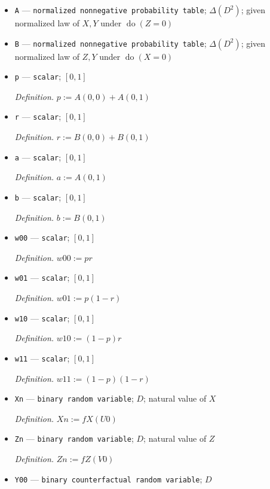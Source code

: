 \documentclass{article}
\begin{document}
\begin{itemize}
  \par\smallskip\noindent\emph{Definition.} law induced by \(M\) under surgical interventions
  \item \texttt{A} --- \texttt{normalized nonnegative probability table}; \(\Delta(D^2)\); given normalized law of \(X,Y\) under \(\operatorname{do}(Z=0)\)
  \item \texttt{B} --- \texttt{normalized nonnegative probability table}; \(\Delta(D^2)\); given normalized law of \(Z,Y\) under \(\operatorname{do}(X=0)\)
  \item \texttt{p} --- \texttt{scalar}; \([0,1]\)
  \par\smallskip\noindent\emph{Definition.} \(p:=A(0,0)+A(0,1)\)
  \item \texttt{r} --- \texttt{scalar}; \([0,1]\)
  \par\smallskip\noindent\emph{Definition.} \(r:=B(0,0)+B(0,1)\)
  \item \texttt{a} --- \texttt{scalar}; \([0,1]\)
  \par\smallskip\noindent\emph{Definition.} \(a:=A(0,1)\)
  \item \texttt{b} --- \texttt{scalar}; \([0,1]\)
  \par\smallskip\noindent\emph{Definition.} \(b:=B(0,1)\)
  \item \texttt{w00} --- \texttt{scalar}; \([0,1]\)
  \par\smallskip\noindent\emph{Definition.} \(w00:=pr\)
  \item \texttt{w01} --- \texttt{scalar}; \([0,1]\)
  \par\smallskip\noindent\emph{Definition.} \(w01:=p(1-r)\)
  \item \texttt{w10} --- \texttt{scalar}; \([0,1]\)
  \par\smallskip\noindent\emph{Definition.} \(w10:=(1-p)r\)
  \item \texttt{w11} --- \texttt{scalar}; \([0,1]\)
  \par\smallskip\noindent\emph{Definition.} \(w11:=(1-p)(1-r)\)
  \item \texttt{Xn} --- \texttt{binary random variable}; \(D\); natural value of \(X\)
  \par\smallskip\noindent\emph{Definition.} \(Xn:=fX(U0)\)
  \item \texttt{Zn} --- \texttt{binary random variable}; \(D\); natural value of \(Z\)
  \par\smallskip\noindent\emph{Definition.} \(Zn:=fZ(V0)\)
  \item \texttt{Y00} --- \texttt{binary counterfactual random variable}; \(D\)

\end{itemize}
\end{document}
